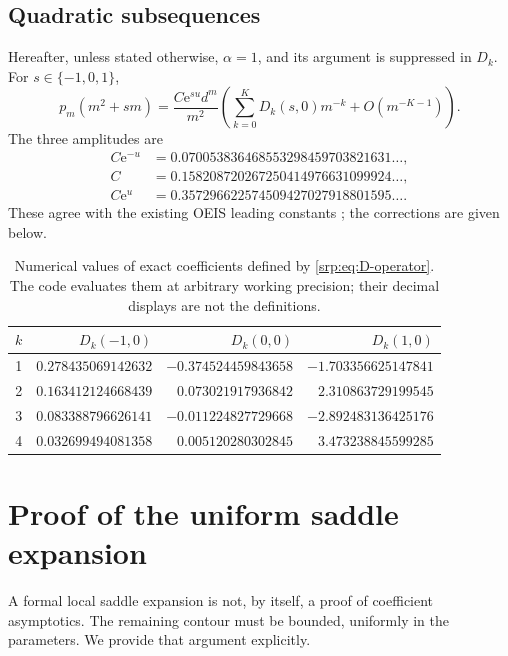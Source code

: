 \documentclass[11pt,a4paper]{article}
\numberwithin{equation}{section}
\theoremstyle{definition}
\theoremstyle{remark}
\newcommand{\e}{\mathrm e}
\begin{document}
\subsection{Quadratic subsequences}
Hereafter, unless stated otherwise, $\alpha=1$, and its argument is
suppressed in $D_k$. For $s\in\{-1,0,1\}$,
\begin{equation}
 p_m(m^2+sm)=\frac{C\e^{su}d^m}{m^2}
 \left(\sum_{k=0}^K D_k(s,0)m^{-k}+O(m^{-K-1})\right).
 \label{srp:eq:shifted}
\end{equation}
The three amplitudes are
\begin{align*}
 C\e^{-u}&=0.070053836468553298459703821631\ldots,\\
 C&=0.158208720267250414976631099924\ldots,\\
 C\e^{u}&=0.357296622574509427027918801595\ldots.
\end{align*}
These agree with the existing OEIS leading constants
\cite{oeisMinus,oeisSquare,oeisPlus}; the corrections are given below.
\begin{table}[htbp]
\centering\small
\begin{tabular}{r r r r}
\toprule
$k$ & $D_k(-1,0)$ & $D_k(0,0)$ & $D_k(1,0)$\\
\midrule
1 & $0.278435069142632$ & $-0.374524459843658$ & $-1.703356625147841$\\
2 & $0.163412124668439$ & $0.073021917936842$ & $2.310863729199545$\\
3 & $0.083388796626141$ & $-0.011224827729668$ & $-2.892483136425176$\\
4 & $0.032699494081358$ & $0.005120280302845$ & $3.473238845599285$\\
\bottomrule
\end{tabular}
\caption{Numerical values of exact coefficients defined by
\eqref{srp:eq:D-operator}. The code evaluates them at arbitrary working
precision; their decimal displays are not the definitions.}
\label{srp:tab:D}
\end{table}

\section{Proof of the uniform saddle expansion}
\label{srp:sec:proof-saddle}

A formal local saddle expansion is not, by itself, a proof of coefficient
asymptotics. The remaining contour must be bounded, uniformly in the
parameters. We provide that argument explicitly.
\end{document}
